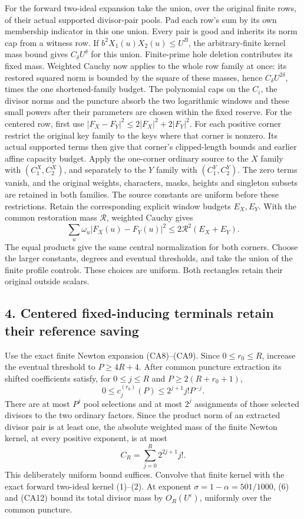 For the forward two-ideal expansion take the union, over the original
finite rows, of their actual supported divisor-pair pools. Pad each
row's sum by its own membership indicator in this one union. Every
pair is good and inherits its norm cap from a witness row.
If \(b^2X_1(u)X_2(u)\le U^B\), the arbitrary-finite kernel mass
bound gives \(C_\delta U^\delta\) for this union. Finite-prime hole
deletion contributes its fixed mass. Weighted Cauchy now applies to
the whole row family at once: its restored squared norm is bounded
by the square of these masses, hence \(C_\delta U^{2\delta}\),
times the one shortened-family budget.
The polynomial caps on the \(C_i\), the divisor norms and the
puncture absorb the two logarithmic windows and these small powers
after their parameters are chosen within the fixed reserve.
For the centered row, first use
\(\lvert F_X-F_Y\rvert^2\le2\lvert F_X\rvert^2+2\lvert F_Y\rvert^2\).
For each positive corner restrict the original key family to the keys
where that corner is nonzero. Its actual supported terms then give
that corner's clipped-length bounds and earlier affine capacity budget.
Apply the one-corner ordinary source to the \(X\) family with
\((C_1^X,C_2^X)\), and separately to the \(Y\) family with
\((C_1^Y,C_2^Y)\). The zero terms vanish, and the original weights,
characters, masks, heights and singleton subsets are retained in both
families. The source constants are uniform before these restrictions.
Retain the corresponding explicit window budgets \(E_X,E_Y\).
With the common restoration mass \(\mathcal R\), weighted Cauchy gives
\[
 \sum_u\omega_u|F_X(u)-F_Y(u)|^2
 \le 2\mathcal R^2(E_X+E_Y).
\]
The equal products give the same central normalization for both
corners. Choose the larger constants, degrees and eventual thresholds,
and take the union of the finite profile controls. These choices are
uniform. Both rectangles retain their original outside scalars.


\hypertarget{sources:centered-fixed-inducing-terminals-retain-their-reference-saving}{%
\subsection{4. Centered fixed-inducing terminals retain their reference saving}\label{sources:centered-fixed-inducing-terminals-retain-their-reference-saving}}

Use the exact finite Newton expansion (CA8)--(CA9). Since \(0\le r_0\le R\), increase the eventual threshold to \(P\ge4R+4\). After common puncture extraction its shifted coefficients satisfy, for \(0\le j\le R\) and \(P\ge2(R+r_0+1)\), \[
 0\le c_j^{(r_0)}(P)\le 2^{j+1}j!P^{-j}.
\] There are at most \(P^j\) pool selections and at most \(2^j\) assignments of those selected divisors to the two ordinary factors. Since the product norm of an extracted divisor pair is at least one, the absolute weighted mass of the finite Newton kernel, at every positive exponent, is at most \[
 C_R=\sum_{j=0}^R2^{2j+1}j!.
 \tag{CA12}
\] This deliberately uniform bound suffices. Convolve that finite kernel with the exact forward two-ideal kernel (1)--(2). At exponent \(\sigma=1-\alpha=501/1000\), (6) and (CA12) bound its total divisor mass by \(O_R(U^\epsilon)\), uniformly over the common puncture.

